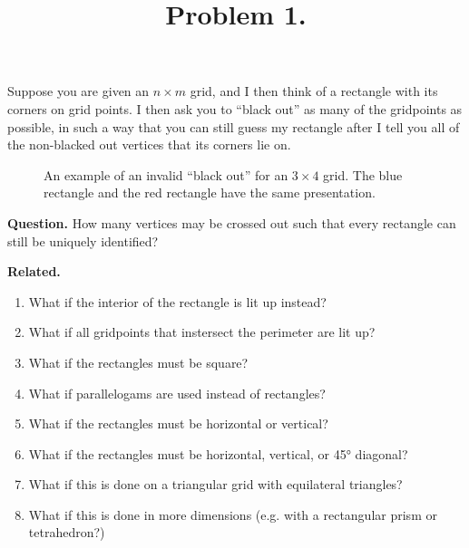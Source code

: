 \documentclass{article}
\newenvironment{question}{\begin{trivlist}\item[\textbf{Question.}]}{\end{trivlist}}
\newenvironment{related}{\begin{trivlist}\item[\textbf{Related.}]\end{trivlist}\begin{enumerate}}{\end{enumerate}}
\begin{document}
\title{Problem 1.}
\date{}
\author{}
\maketitle

Suppose you are given an $n \times m$ grid, and I then think of a rectangle with
its corners on grid points.
I then ask you to ``black out'' as many of the gridpoints as possible,
in such a way that you can still guess my rectangle after I tell you all of the
non-blacked out vertices that its corners lie on.\\
\begin{figure}[!h]
  \centering
  \caption{
    An example of an invalid ``black out'' for an $3 \times 4$ grid.
    The blue rectangle and the red rectangle have the same presentation.
  }
\end{figure}

\begin{question}
  How many vertices may be crossed out such that every rectangle can still
    be uniquely identified?
\end{question}
\begin{related}
  \item What if the interior of the rectangle is lit up instead?
  \item What if all gridpoints that instersect the perimeter are lit up?
  \item What if the rectangles must be square?
  \item What if parallelogams are used instead of rectangles?
  \item What if the rectangles must be horizontal or vertical?
  \item What if the rectangles must be horizontal, vertical, or 45° diagonal?
  \item What if this is done on a triangular grid with equilateral triangles?
  \item What if this is done in more dimensions
    (e.g. with a rectangular prism or tetrahedron?)
\end{related}
\end{document}
